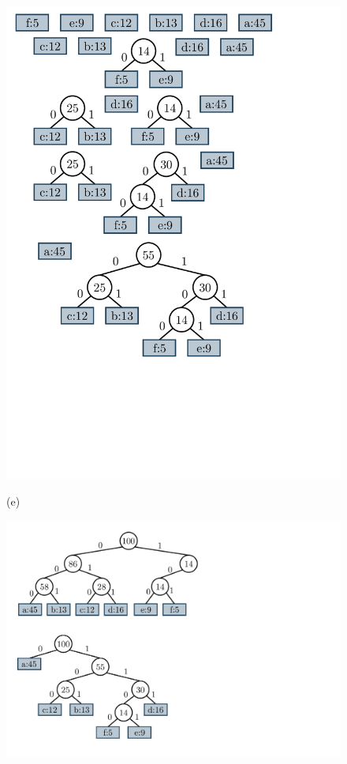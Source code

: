\begin{figure}
    \begin{minipage}{1\textwidth}
    		\centering
    		\begin{minipage}{0.45\textwidth}
    			\centering
    			\includegraphics[scale=.4, clip, trim=10 210 170 410]{img/graphs-huffman2.pdf}
    			
    			(e)
    		\end{minipage}
    		\begin{minipage}{0.45\textwidth}
    			\centering
    			\includegraphics[scale=.4, clip, trim=20 40 430 280 ]{img/graphs-fixVarTrees.pdf}


\end{minipage}
\end{minipage}
\end{figure}
